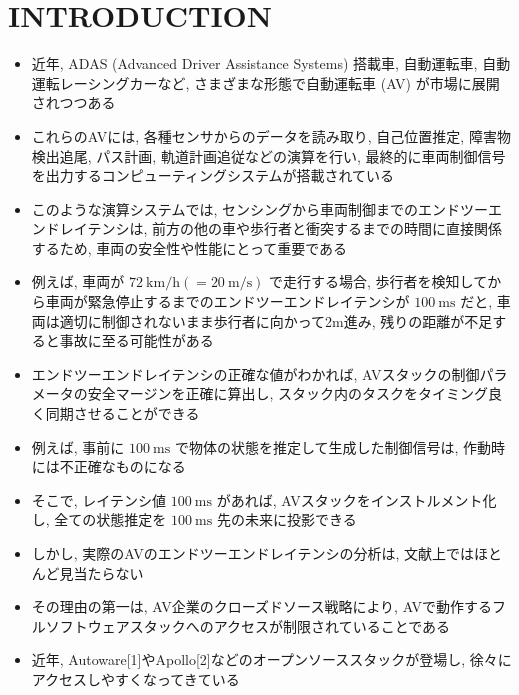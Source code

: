 
\section{INTRODUCTION}
\label{sec: introduction}

\begin{frame}{}
    \begin{itemize}
        \item 近年, ADAS (Advanced Driver Assistance Systems) 搭載車, 自動運転車, 自動運転レーシングカーなど, さまざまな形態で自動運転車 (AV) が市場に展開されつつある
        \item これらのAVには, 各種センサからのデータを読み取り, 自己位置推定, 障害物検出追尾, パス計画, 軌道計画追従などの演算を行い, 最終的に車両制御信号を出力するコンピューティングシステムが搭載されている
        \item このような演算システムでは, センシングから車両制御までのエンドツーエンドレイテンシは, 前方の他の車や歩行者と衝突するまでの時間に直接関係するため, 車両の安全性や性能にとって重要である
    \end{itemize}
\end{frame}

\begin{frame}{}
    \begin{itemize}
        \item 例えば, 車両が $72 \mathrm{~km} / \mathrm{h}(=20 \mathrm{~m} / \mathrm{s})$ で走行する場合, 歩行者を検知してから車両が緊急停止するまでのエンドツーエンドレイテンシが $100 \mathrm{~ms}$ だと, 車両は適切に制御されないまま歩行者に向かって2m進み, 残りの距離が不足すると事故に至る可能性がある
        \item エンドツーエンドレイテンシの正確な値がわかれば, AVスタックの制御パラメータの安全マージンを正確に算出し, スタック内のタスクをタイミング良く同期させることができる
        \item 例えば, 事前に $100 \mathrm{~ms}$ で物体の状態を推定して生成した制御信号は, 作動時には不正確なものになる
        \item そこで, レイテンシ値 $100 \mathrm{~ms}$ があれば, AVスタックをインストルメント化し, 全ての状態推定を $100 \mathrm{~ms}$ 先の未来に投影できる
    \end{itemize}
\end{frame}

\begin{frame}{}
    \begin{itemize}
        \item しかし, 実際のAVのエンドツーエンドレイテンシの分析は, 文献上ではほとんど見当たらない
        \item その理由の第一は, AV企業のクローズドソース戦略により, AVで動作するフルソフトウェアスタックへのアクセスが制限されていることである
        \item 近年, Autoware[1]やApollo[2]などのオープンソーススタックが登場し, 徐々にアクセスしやすくなってきている
    \end{itemize}
\end{frame}

